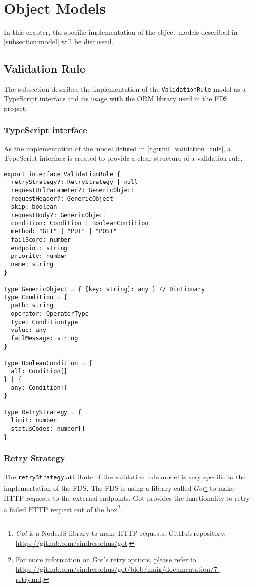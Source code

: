 \section{Object Models}
  \label{impl_model}

In this chapter, the specific implementation of the object models described in \autoref{subsection:model} will be discussed. 

  \subsection{Validation Rule}
    \label{impl_model:rule}

    The subsection describes the implementation of the \verb;ValidationRule; model as a TypeScript interface and its usage with the ORM library used in the FDS project. 

    \subsubsection{TypeScript interface}
      As the implementation of the model defined in \autoref{fig:uml_validation_rule}, a TypeScript interface is created to provide a clear structure of a validation rule.

      \begin{lstlisting}[style=es6, caption={TypeScript interface of a validation rule (TypeScript)}]
export interface ValidationRule {
  retryStrategy?: RetryStrategy | null
  requestUrlParameter?: GenericObject
  requestHeader?: GenericObject
  skip: boolean
  requestBody?: GenericObject
  condition: Condition | BooleanCondition
  method: "GET" | "PUT" | "POST" 
  failScore: number
  endpoint: string
  priority: number
  name: string
}

type GenericObject = { [key: string]: any } // Dictionary
type Condition = {
  path: string
  operator: OperatorType
  type: ConditionType
  value: any
  failMessage: string
}

type BooleanCondition = {
  all: Condition[]
} | {
  any: Condition[]
}

type RetryStrategy = {
  limit: number
  statusCodes: number[] 
}
      \end{lstlisting}
 
    \subsubsection{Retry Strategy}
      \label{impl_model:rule__retry}

      The \verb;retryStrategy; attribute of the validation rule model is very specific to the implementation of the FDS. The FDS is using a library called \emph{Got}\footnote{\emph{Got} is a Node.JS library to make HTTP requests. GitHub repository: \url{https://github.com/sindresorhus/got}.} to make HTTP requests to the external endpoints. Got provides the functionality to retry a failed HTTP request out of the box\footnote{For more information on Got's retry options, please refer to \url{https://github.com/sindresorhus/got/blob/main/documentation/7-retry.md}.}.

